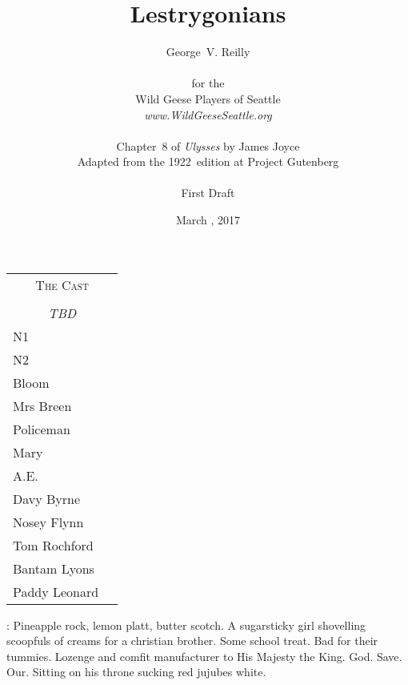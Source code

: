 


\title{\Huge Lestrygonians}
\author{George~V. Reilly\\
\\
{\small for the}\\
Wild Geese Players of Seattle\\
{\emph{www.WildGeeseSeattle.org}}\\
\\
{\small Chapter~8 of \emph{Ulysses} by James Joyce}\\
{\small Adapted from the 1922~edition at Project Gutenberg}
\\
\\
{\small First Draft}}
\date{March , 2017}
\raggedbottom



\maketitle
\thispagestyle{empty}
\pagebreak

\begin{tabular}{lp{10cm}}
    \multicolumn{2}{c}{\Large \textsc{The Cast}} \\
\\
    \multicolumn{2}{c}{\large \textit{TBD}} \\
N1 \\
N2 \\
Bloom \\
Mrs Breen \\
Policeman \\
Mary \\
A.E. \\
Davy Byrne \\
Nosey Flynn \\
Tom Rochford \\
Bantam Lyons \\
Paddy Leonard \\
\end{tabular}

\thispagestyle{empty}
\newpage


\setcounter{page}{1}

\BloomInt:
Pineapple rock, lemon platt, butter scotch.
A sugarsticky girl shovelling scoopfuls of creams for a christian brother.
Some school treat.
Bad for their tummies.
Lozenge and comfit manufacturer to His Majesty the King.
God.
Save.
Our.
Sitting on his throne sucking red jujubes white.

